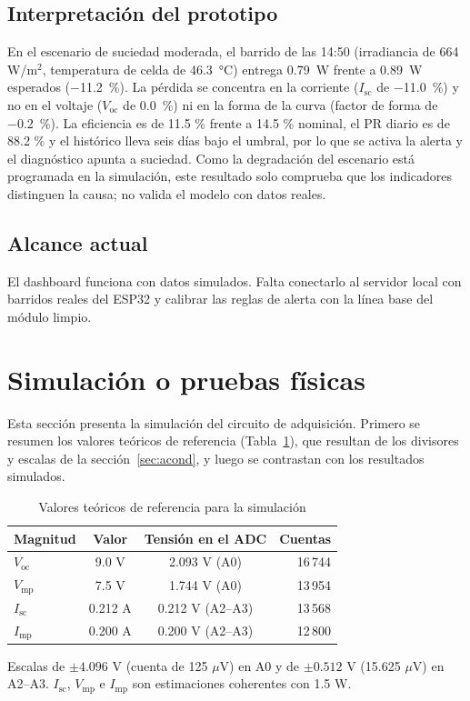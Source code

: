 \documentclass[10pt,letterpaper,twocolumn]{article}
\begin{document}
\subsection{Interpretación del prototipo}
En el escenario de suciedad moderada, el barrido de las 14:50 (irradiancia de 664 W/m$^2$, temperatura de celda de 46.3~°C) entrega \SI{0.79}{\watt} frente a \SI{0.89}{\watt} esperados (\SI{-11.2}{\percent}). La pérdida se concentra en la corriente ($I_\mathrm{sc}$ de \SI{-11.0}{\percent}) y no en el voltaje ($V_\mathrm{oc}$ de \SI{0.0}{\percent}) ni en la forma de la curva (factor de forma de \SI{-0.2}{\percent}). La eficiencia es de 11.5 \% frente a 14.5 \% nominal, el PR diario es de 88.2 \% y el histórico lleva seis días bajo el umbral, por lo que se activa la alerta y el diagnóstico apunta a suciedad. Como la degradación del escenario está programada en la simulación, este resultado solo comprueba que los indicadores distinguen la causa; no valida el modelo con datos reales.

\subsection{Alcance actual}
El dashboard funciona con datos simulados. Falta conectarlo al servidor local con barridos reales del ESP32 y calibrar las reglas de alerta con la línea base del módulo limpio.

\section{Simulación o pruebas físicas}\label{sec:sim}
Esta sección presenta la simulación del circuito de adquisición. Primero se resumen los valores teóricos de referencia (Tabla~\ref{tab:teor}), que resultan de los divisores y escalas de la sección~\ref{sec:acond}, y luego se contrastan con los resultados simulados.

\begin{table}[t]
\centering
\caption{Valores teóricos de referencia para la simulación}
\label{tab:teor}
\footnotesize
\begin{tabular}{@{}lccr@{}}
\toprule
Magnitud & Valor & Tensión en el ADC & Cuentas\\
\midrule
$V_\mathrm{oc}$ & 9.0 V & 2.093 V (A0) & 16\,744\\
$V_\mathrm{mp}$ & 7.5 V & 1.744 V (A0) & 13\,954\\
$I_\mathrm{sc}$ & 0.212 A & 0.212 V (A2--A3) & 13\,568\\
$I_\mathrm{mp}$ & 0.200 A & 0.200 V (A2--A3) & 12\,800\\
\bottomrule
\end{tabular}

\smallskip
{\scriptsize Escalas de $\pm 4.096$ V (cuenta de 125 $\mu$V) en A0 y de $\pm 0.512$ V (15.625 $\mu$V) en A2--A3. $I_\mathrm{sc}$, $V_\mathrm{mp}$ e $I_\mathrm{mp}$ son estimaciones coherentes con 1.5 W.}
\end{table}
\end{document}
